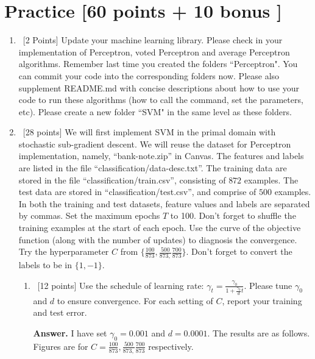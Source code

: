 \documentclass[12pt, fullpage,letterpaper]{article}
\begin{document}
\section{Practice [60 points + 10 bonus ]}
\begin{enumerate}


	\item~[2 Points] Update your machine learning library. Please check in your implementation of Perceptron, voted Perceptron and average Perceptron algorithms. Remember last time you created the folders ``Perceptron". You can commit your code into the corresponding folders now. Please also supplement README.md with concise descriptions about how to use your code to run these algorithms (how to call the command, set the parameters, etc). Please create a new folder ``SVM" in the same level as these folders.  


	\item~[28 points] We will first implement SVM in the primal domain with stochastic sub-gradient descent. We will reuse the  dataset for Perceptron implementation, namely, ``bank-note.zip'' in Canvas. The features and labels are listed in the file ``classification/data-desc.txt''. The training data are stored in the file ``classification/train.csv'', consisting of $872$ examples. The test data are stored in ``classification/test.csv'', and comprise of $500$ examples. In both the training and test datasets, feature values and labels are separated by commas. Set the maximum epochs $T$ to 100. Don't forget to shuffle the training examples at the start of each epoch. Use the curve of the objective function (along with the number of updates) to diagnosis the convergence. Try the hyperparameter $C$ from $\{ \frac{100}{873}, \frac{500}{873,} \frac{700}{873}\}$. Don't forget to convert the labels to be in $\{1, -1\}$.  
	\begin{enumerate}
		\item~[12 points] Use the schedule of learning rate: $\gamma_t = \frac{\gamma_0}{1+\frac{\gamma_0}{d}t}	$. Please tune $\gamma_0$ and $d$ to ensure convergence. For each setting of $C$, report your training and test error. 

	
\item[{\bf Answer.}] I have set $\gamma_0 = 0.001$ and $d = 0.0001$. The results are as follows. Figures are for $C=  \frac{100}{873}, \frac{500}{873,} \frac{700}{873}$ respectively. 
		

\end{enumerate}
\end{enumerate}
\end{document}
